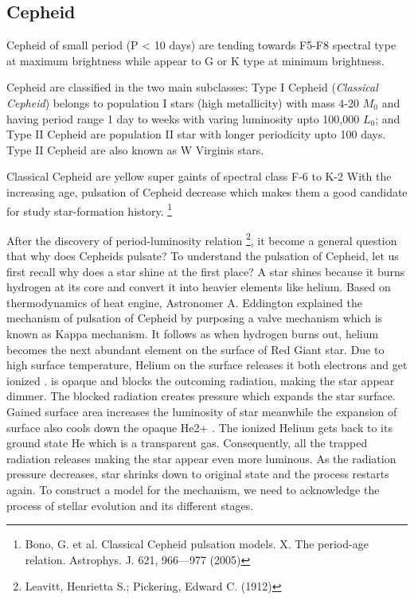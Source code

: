 \subsection{Cepheid}

Cepheid of small period (P < 10 days) are tending towards F5-F8 spectral type at maximum brightness while appear to G or K type at minimum brightness. \cite{1996JRASC..90...82T} 


Cepheid are classified in the two main subclasses: Type I Cepheid (\textit{Classical Cepheid}) belongs to population I stars (high metallicity) with mass 4-20 $M_0$ and having period range 1 day to weeks with varing luminosity upto 100,000 $L_0$; and Type II Cepheid are population II star with longer periodicity upto 100 days. Type II Cepheid are also known as W Virginis stars. 

Classical Cepheid are yellow super gaints of spectral class F-6 to K-2 With the increasing age, pulsation of Cepheid decrease which makes them a good candidate for study star-formation history. \footnote{Bono, G. et al. Classical Cepheid pulsation models. X. The period-age relation. Astrophys. J. 621, 966—977 (2005)} 

After the discovery of period-luminosity relation \footnote{Leavitt, Henrietta S.; Pickering, Edward C. (1912)}, it become a general question that why does
Cepheids pulsate? To understand the pulsation of Cepheid, let us first recall why does a star
shine at the first place? A star shines because it burns hydrogen at its core and convert it
into heavier elements like helium. Based on thermodynamics of heat engine, Astronomer A. Eddington explained the mechanism of pulsation
of Cepheid by purposing a valve mechanism which is known as Kappa mechanism. It follows as when hydrogen burns out, helium becomes the next abundant element
on the surface of Red Giant star. Due to high surface temperature, Helium on the surface releases it both electrons and get ionized  .  is opaque and blocks the outcoming radiation, making the star appear dimmer. The
blocked radiation creates pressure which expands the star surface. Gained surface area increases
the luminosity of star meanwhile the expansion of surface also cools down the opaque He2+ . The
ionized Helium gets back to its ground state He which is a transparent gas. Consequently, all
the trapped radiation releases making the star appear even more luminous. As the radiation
pressure decreases, star shrinks down to original state and the process restarts again. To construct a model for the mechanism, we need to acknowledge the process of stellar evolution and its different stages. 

